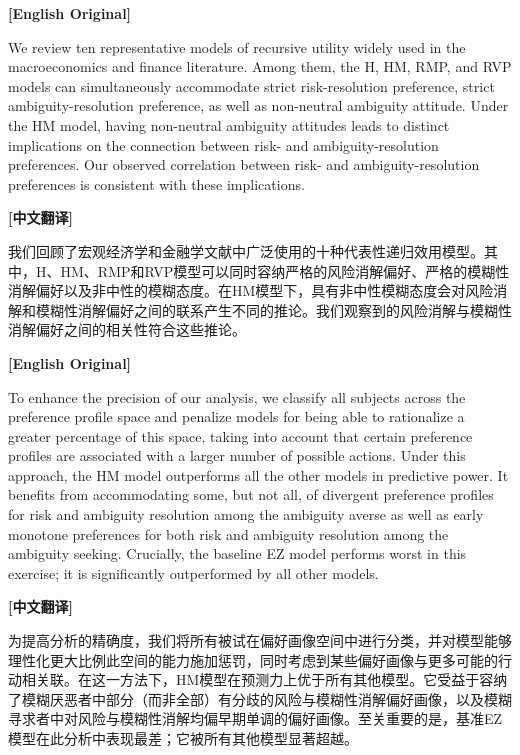 \documentclass[12pt,a4paper]{ctexart}
\newenvironment{original}{%
  \par\medskip\noindent\textbf{[English Original]}\par\smallskip
  \color{black}\small
}{%
  \par\medskip
}
\newenvironment{translation}{%
  \par\noindent\textbf{[中文翻译]}\par\smallskip
  \color{blue}\small
}{%
  \par\bigskip
}
\theoremstyle{definition}
\theoremstyle{remark}
\begin{document}
\begin{original}
We review ten representative models of recursive utility widely used in the macroeconomics and finance literature. Among them, the H, HM, RMP, and RVP models can simultaneously accommodate strict risk-resolution preference, strict ambiguity-resolution preference, as well as non-neutral ambiguity attitude. Under the HM model, having non-neutral ambiguity attitudes leads to distinct implications on the connection between risk- and ambiguity-resolution preferences. Our observed correlation between risk- and ambiguity-resolution preferences is consistent with these implications.
\end{original}
\begin{translation}
我们回顾了宏观经济学和金融学文献中广泛使用的十种代表性递归效用模型。其中，H、HM、RMP和RVP模型可以同时容纳严格的风险消解偏好、严格的模糊性消解偏好以及非中性的模糊态度。在HM模型下，具有非中性模糊态度会对风险消解和模糊性消解偏好之间的联系产生不同的推论。我们观察到的风险消解与模糊性消解偏好之间的相关性符合这些推论。
\end{translation}

\begin{original}
To enhance the precision of our analysis, we classify all subjects across the preference profile space and penalize models for being able to rationalize a greater percentage of this space, taking into account that certain preference profiles are associated with a larger number of possible actions. Under this approach, the HM model outperforms all the other models in predictive power. It benefits from accommodating some, but not all, of divergent preference profiles for risk and ambiguity resolution among the ambiguity averse as well as early monotone preferences for both risk and ambiguity resolution among the ambiguity seeking. Crucially, the baseline EZ model performs worst in this exercise; it is significantly outperformed by all other models.
\end{original}
\begin{translation}
为提高分析的精确度，我们将所有被试在偏好画像空间中进行分类，并对模型能够理性化更大比例此空间的能力施加惩罚，同时考虑到某些偏好画像与更多可能的行动相关联。在这一方法下，HM模型在预测力上优于所有其他模型。它受益于容纳了模糊厌恶者中部分（而非全部）有分歧的风险与模糊性消解偏好画像，以及模糊寻求者中对风险与模糊性消解均偏早期单调的偏好画像。至关重要的是，基准EZ模型在此分析中表现最差；它被所有其他模型显著超越。
\end{translation}
\end{document}

